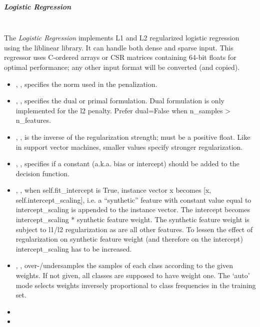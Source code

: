 \subparagraph{Logistic Regression}
\mbox{}
\\The \textit{Logistic Regression} implements L1 and L2 regularized logistic
regression using the liblinear library.
%
It can handle both dense and sparse input.
%
This regressor uses C-ordered arrays or CSR matrices containing 64-bit floats
for optimal performance; any other input format will be converted (and copied).
%
\begin{itemize}
  \item {}, , specifies the norm
  used in the penalization.
  \item {}, , specifies the dual or primal
  formulation.
  Dual formulation is only implemented for the l2 penalty.
  Prefer dual=False when n\_samples > n\_features.
  \item {}, , is the inverse of the
  regularization strength; must be a positive float.
  Like in support vector machines, smaller values specify stronger
  regularization.
  \item {}, , specifies if a constant
  (a.k.a. bias or intercept) should be added to the decision function.
  \item {}, , when
  self.fit\_intercept is True, instance vector x becomes [x,
  self.intercept\_scaling], i.e. a ``synthetic'' feature with constant value
  equal to intercept\_scaling is appended to the instance vector.
  The intercept becomes intercept\_scaling * synthetic feature
  weight.
  \nb The synthetic feature weight is subject to l1/l2 regularization as are all
  other features.
  To lessen the effect of regularization on synthetic feature weight (and
  therefore on the intercept) intercept\_scaling has to be increased.
  \item {}, ,
  over-/undersamples the samples of each class according to the given weights.
  If not given, all classes are supposed to have weight one.
  The `auto' mode selects weights inversely proportional to class frequencies
  in the training set.
  \item {}
  \item \tolDescriptionC{}
\end{itemize}

